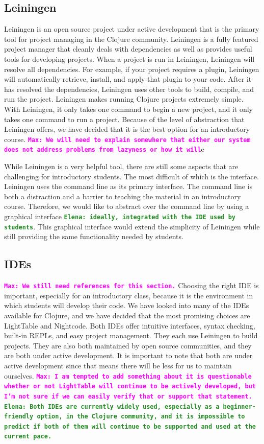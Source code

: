\documentclass[12pt]{article}
\newcommand{\comment}[1]{{\bf \tt  {#1}}}
\newcommand{\emcomment}[1]{\textcolor{ForestGreen}{\comment{Elena: {#1}}}}
\newcommand{\mmcomment}[1]{\textcolor{magenta}{\comment{Max: {#1}}}}
\begin{document}
\subsection{Leiningen}
Leiningen is an open source project under active development that is the primary tool for project managing in the Clojure community\cite{LeinGitHub}. Leiningen is a fully featured project manager that cleanly deals with dependencies as well as provides useful tools for developing projects. When a project is run in Leiningen, Leiningen will resolve all dependencies. For example, if your project requires a plugin, Leiningen will automatically retrieve, install, and apply that plugin to your code. After it has resolved the dependencies, Leiningen uses other tools to build, compile, and run the project. Leiningen makes running Clojure projects extremely simple. With Leiningen, it only takes one command to begin a new project, and it only takes one command to run a project. Because of the level of abstraction that Leiningen offers, we have decided that it is the best option for an introductory course. \mmcomment{We will need to explain somewhere that either our system does not address problems from lazyness or how it will}e

While Leiningen is a very helpful tool, there are still some aspects that are challenging for introductory students. The most difficult of which is the interface. Leiningen uses the command line as its primary interface. The command line is both a distraction and a barrier to teaching the material in an introductory course. Therefore, we would like to abstract over the command line by using a graphical interface \emcomment{ideally, integrated with the IDE used by students}. This graphical interface would extend the simplicity of Leiningen while still providing the same functionality needed by students.

\subsection{IDEs}
\mmcomment{We still need references for this section.}
Choosing the right IDE is important, especially for an introductory class, because it is the environment in which students will develop their code. We have looked into many of the IDEs available for Clojure, and we have decided that the most promising choices are LightTable and Nightcode. Both IDEs offer intuitive interfaces, syntax checking, built-in REPLs, and easy project management. They each use Leiningen to build projects. They are also both maintained by open source communities, and they are both under active development. It is important to note that both are under active development since that means there will be less for us to maintain ourselves. 
\mmcomment{I am tempted to add something about it is questionable whether or not LightTable will continue to be actively developed, but I'm not sure if we can easily verify that or support that statement.}
\emcomment{Both IDEs are currently widely used, especially as a beginner-friendly option, in the Clojure community, and it is impossible to predict if both of them will continue to be supported and used at the current pace.}
\end{document}
